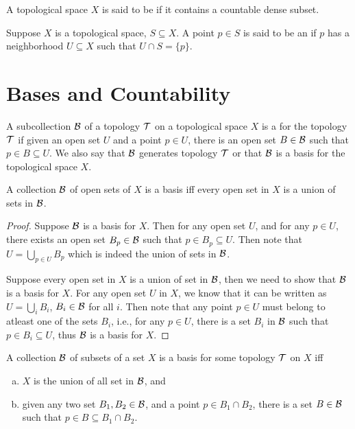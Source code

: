 \documentclass[11pt,a4paper]{article}
\begin{document}
\begin{definition}
A topological space $X$ is said to be  if it contains a countable dense subset.
\end{definition}

\begin{definition}
Suppose $X$ is a topological space, $S\subseteq X$. A point $p\in S$ is said to be an  if $p$ has a neighborhood $U\subseteq X$ such that $U\cap S = \{p\}$.
\end{definition}

\section{Bases and Countability}

\begin{definition}
A subcollection $\mathcal{B}$ of a topology $\mathcal{T}$ on a topological space $X$ is a  for the topology $\mathcal{T}$ if given an open set $U$ and a point $p\in U$, there is an open set $B\in\mathcal{B}$ such that $p\in B\subseteq U$. We also say that {${\mathcal{B}}$ generates topology ${\mathcal{T}}$} or that $\mathcal{B}$ is a {basis for the topological space ${X}$}.
\end{definition}

\begin{proposition}\label{prop:basis_union_characterization}
A collection $\mathcal{B}$ of open sets of $X$ is a basis iff every open set in $X$ is a union of sets in $\mathcal{B}$.
\end{proposition}

\begin{proof}
\forward Suppose $\mathcal{B}$ is a basis for $X$. Then for any open set $U$, and for any $p\in U$, there exists an open set $B_p\in \mathcal{B}$ such that $p\in B_p\subseteq U$. Then note that $U = \bigcup_{p\in U} B_p$ which is indeed the union of sets in $\mathcal{B}$.

\noindent\converse Suppose every open set in $X$ is a union of set in $\mathcal{B}$, then we need to show that $\mathcal{B}$ is a basis for $X$. For any open set $U$ in $X$, we know that it can be written as $U = \bigcup_{i} B_i$, $B_i\in \mathcal{B}$ for all $i$. Then note that any point $p\in U$ must belong to atleast one of the sets $B_i$, i.e., for any $p\in U$, there is a set $B_i$ in $\mathcal{B}$ such that $p\in B_i\subseteq U$, thus $\mathcal{B}$ is a basis for $X$. 
\end{proof}

\begin{proposition}\label{prop:basis_equivalence}
A collection $\mathcal{B}$ of subsets of a set $X$ is a basis for some topology $\mathcal{T}$ on $X$ iff
\begin{enumerate}[(a)]
    \item $X$ is the union of all set in $\mathcal{B}$, and
    \item given any two set $B_1, B_2\in \mathcal{B}$, and a point $p\in B_1\cap B_2$, there is a set $B\in \mathcal{B}$ such that $p\in B\subseteq B_1\cap B_2$.
\end{enumerate}
\end{proposition}
\end{document}
